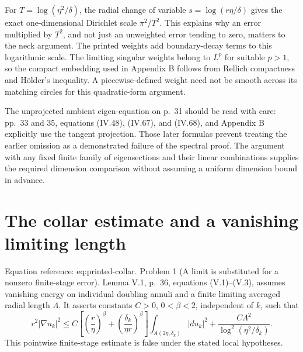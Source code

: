 \documentclass[10pt]{article}
\begin{document}
For \(T=\log(\eta^2/\delta)\), the radial change of variable \(s=\log(r\eta/\delta)\) gives the exact one-dimensional Dirichlet scale \(\pi^2/T^2\). This explains why an error multiplied by \(T^2\), and not just an unweighted error tending to zero, matters to the neck argument. The printed weights add boundary-decay terms to this logarithmic scale. The limiting singular weights belong to \(L^p\) for suitable \(p>1\), so the compact embedding used in Appendix B follows from Rellich compactness and Hölder’s inequality. A piecewise-defined weight need not be smooth across its matching circles for this quadratic-form argument.\par
The unprojected ambient eigen-equation on p. 31 should be read with care: pp. 33 and 35, equations (IV.48), (IV.67), and (IV.68), and Appendix B explicitly use the tangent projection. Those later formulas prevent treating the earlier omission as a demonstrated failure of the spectral proof. The argument with any fixed finite family of eigensections and their linear combinations supplies the required dimension comparison without assuming a uniform dimension bound in advance.\par
\section*{The collar estimate and a vanishing limiting length}
Equation reference: eq:printed-collar. Problem 1 (A limit is substituted for a nonzero finite-stage error).  Lemma V.1, p. 36, equations (V.1)–(V.3), assumes vanishing energy on individual doubling annuli and a finite limiting averaged radial length \(\Lambda\). It asserts constants \(C>0\), \(0<\beta<2\), independent of \(k\), such that \[
 r^2|\nabla u_k|^2
 \le C\left[\left(\frac r\eta\right)^\beta
       +\left(\frac{\delta_k}{\eta r}\right)^\beta\right]
       \int_{A(2\eta,\delta_k)}|du_k|^2
       +\frac{C\Lambda^2}{\log^2(\eta^2/\delta_k)}.\] This pointwise finite-stage estimate is false under the stated local hypotheses.\par
\end{document}
